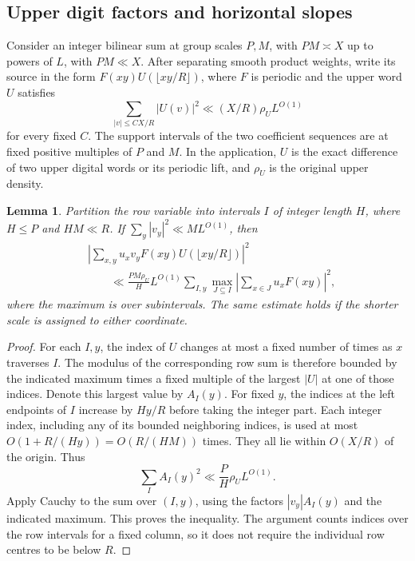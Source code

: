 \documentclass[11pt,a4paper]{article}
\theoremstyle{paperplain}
\newtheorem{lemma}[theorem]{Lemma}
\numberwithin{equation}{section}
\begin{document}
\subsection{Upper digit factors and horizontal slopes}
\label{sec:short-row-weighted-offsets}

Consider an integer bilinear sum at group scales $P,M$, with $PM\asymp X$
up to powers of $L$, with $PM\ll X$. After separating smooth product weights, write its
source in the form $F(xy)U(\lfloor xy/R\rfloor)$, where $F$ is periodic
and the upper word $U$ satisfies
\[
 \sum_{|v|\le C X/R}|U(v)|^2\ll (X/R)\rho_U L^{O(1)}
\]
for every fixed $C$. The support intervals of the two coefficient
sequences are at fixed positive multiples of $P$ and $M$. In the
application, $U$ is the exact difference of two upper digital words
or its periodic lift, and $\rho_U$ is the original upper density.

\begin{lemma}\label{octal:short-row-upper-density}
Partition the row variable into intervals $I$ of integer length $H$,
where $H\le P$ and $HM\ll R$. If $\sum_y|v_y|^2\ll M L^{O(1)}$, then
\begin{align*}
 &\left|\sum_{x,y}u_xv_y F(xy)U(\lfloor xy/R\rfloor)\right|^2\\
 &\qquad\ll \frac{PM\rho_U}{H}L^{O(1)}
    \sum_{I,y}\max_{J\subseteq I}
                       \left|\sum_{x\in J}u_x F(xy)\right|^2,
\end{align*}
where the maximum is over subintervals. The same estimate holds if
the shorter scale is assigned to either coordinate.
\end{lemma}

\begin{proof}
For each $I,y$, the index of $U$ changes at most a fixed number of
times as $x$ traverses $I$. The modulus of the corresponding row
sum is therefore bounded by the indicated maximum times a fixed
multiple of the largest $|U|$ at one of those indices. Denote this
largest value by $A_I(y)$. For fixed $y$, the indices at the left
endpoints of $I$ increase by $Hy/R$ before taking the integer part.
Each integer index, including any of its bounded neighboring indices,
is used at most $O(1+R/(Hy))=O(R/(HM))$ times. They all lie within
$O(X/R)$ of the origin. Thus
\[
 \sum_I A_I(y)^2\ll \frac{P}{H}\rho_U L^{O(1)}.
\]
Apply Cauchy to the sum over $(I,y)$, using the factors
$|v_y|A_I(y)$ and the indicated maximum. This proves the inequality.
The argument counts indices over the row intervals for a fixed column,
so it does not require the individual row centres to be below $R$.
\end{proof}
\end{document}

